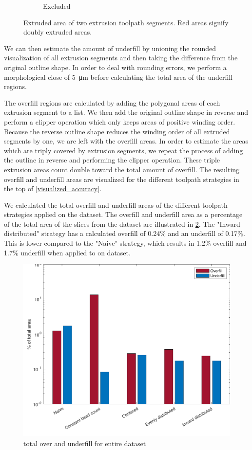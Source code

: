\begin{figure}
\begin{subfigure}{\figwidth}
\caption{Excluded}
\end{subfigure}
\caption{
Extruded area of two extrusion toolpath segments.
Red areas signify doubly extruded areas.
}
\label{segment_visualization}
\end{figure}

We can then estimate the amount of underfill by unioning the rounded visualization of all extrusion segments and then taking the difference from the original outline shape.
In order to deal with rounding errors, we perform a morphological close of \SI{5}{\micro\meter} before calculating the total area of the underfill regions.

The overfill regions are calculated by adding the polygonal areas of each extrusion segment to a list.
We then add the original outline shape in reverse and perform a clipper operation which only keeps areas of positive winding order.
Because the reverse outline shape reduces the winding order of all extruded segments by one, we are left with the overfill areas.
In order to estimate the areas which are triply covered by extrusion segments, we repeat the process of adding the outline in reverse and performing the clipper operation.
These triple extrusion areas count double toward the total amount of overfill.
The resulting overfill and underfill areas are visualized for the different toolpath strategies in the top of \cref{visualized_accuracy}.

We calculated the total overfill and underfill areas of the different toolpath strategies applied on the dataset. 
The overfill and underfill area as a percentage of the total area of the slices from the dataset are illustrated in \cref{over_underfill}.  
The "Inward distributed" strategy has a calculated overfill of 0.24\% and an underfill of 0.17\%.
This is lower compared to the "Naive" strategy, which results in 1.2\% overfill and 1.7\% underfill when applied to on dataset.

\begin{figure}
\includegraphics[width=\columnwidth]{sources/validation/overunderfill.pdf}
\caption{total over and underfill for entire dataset}
\label{over_underfill}
\end{figure}

